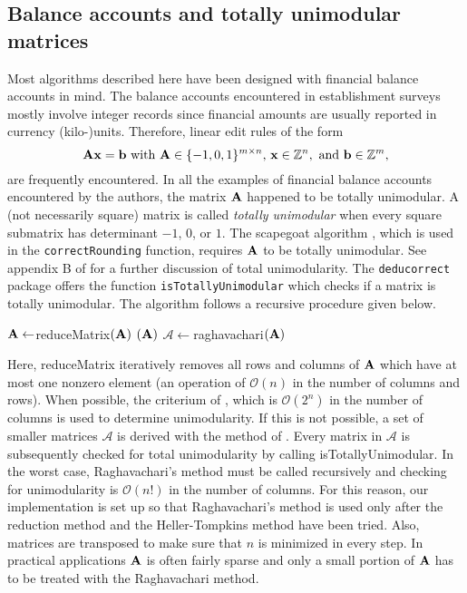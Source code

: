 \documentclass[11pt, fleqn, a4paper]{article}
\begin{document}
\subsection{Balance accounts and totally unimodular matrices}
\label{totallyUnimodularSection}
Most algorithms described here have been designed with financial balance
accounts in mind. The balance accounts encountered in establishment surveys
mostly involve integer records since financial amounts are usually reported in
currency (kilo-)units. Therefore, linear edit rules of the form
%
\begin{equation}
\label{integerRestrictions}
{\bf Ax} = {\bf b} \textrm{ with } {\bf A}\in \{-1,0,1\}^{m\times n}\textrm{, } {\bf x}\in \mathbb{Z}^{n},\textrm{ and } {\bf b}\in\mathbb{Z}^m,
\end{equation}
are frequently encountered. In all the examples of financial balance accounts
encountered by the authors, the matrix $\bf A$ happened to be totally unimodular.
A (not necessarily square) matrix is called {\em totally unimodular} when every
square submatrix has determinant ${-1}$, $0$, or $1$. The scapegoat algorithm
\citep{scholtus:2008}, which is used in the {\tt correctRounding} function,
requires $\bf A$ to be totally unimodular. See appendix B of \cite{scholtus:2008}
for a further discussion of total unimodularity.  The {\tt deducorrect} package
offers the function {\tt isTotallyUnimodular} which checks if a matrix is
totally unimodular. The algorithm follows  a recursive procedure given below.
\begin{algorithmic}[1]
\State ${\bf A}\leftarrow${\sc reduceMatrix}$({\bf A})$
\State{}
\State{}$({\bf A})$
\Else
\State $\mathcal{A} \leftarrow${\sc raghavachari}$({\bf A})$
\State {}
\Else
\State {}
\EndIf
\EndIf
\EndProcedure
\end{algorithmic}
Here, {\sc reduceMatrix} iteratively removes all rows and columns of $\bf A$ which
have at most one nonzero element (an operation of $\mathcal{O}(n)$ in the
number of columns and rows).  When possible, the criterium of
\cite{heller:1956}, which is $\mathcal{O}(2^n)$ in the number of columns is
used to determine unimodularity.  If this is not possible, a set of smaller
matrices $\mathcal{A}$ is derived with the method of \cite{raghavachari:1976}.
Every matrix in $\mathcal{A}$ is subsequently checked for total unimodularity
by calling {\sc isTotallyUnimodular}. In the worst case, Raghavachari's method
must be called recursively and checking for unimodularity is $\mathcal{O}(n!)$
in the number of columns. For this reason, our implementation is set up so that
Raghavachari's method is used only after the reduction method and the
Heller-Tompkins method have been tried. Also, matrices are transposed to make
sure that $n$ is minimized in every step. In practical applications $\bf A$ is
often fairly sparse and only a small portion of $\bf A$ has to be treated with the
Raghavachari method.
\end{document}
